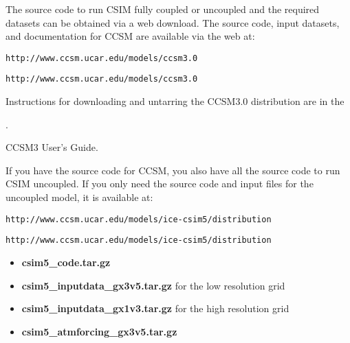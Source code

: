 The source code to run CSIM fully coupled or uncoupled and the required
datasets can be obtained via a web download.  The source code, input
datasets, and documentation for CCSM are available via the web at: \\

\begin{htmlonly}
                     {\tt http://www.ccsm.ucar.edu/models/ccsm3.0} \\
\end{htmlonly}
\begin{latexonly}
  {\tt http://www.ccsm.ucar.edu/models/ccsm3.0} \\
\end{latexonly}

Instructions for downloading and untarring the CCSM3.0 distribution
are in the 
\begin{htmlonly}
  .
\end{htmlonly}
\begin{latexonly}
  CCSM3 User's Guide.
\end{latexonly}
If you have the source code for CCSM, you also have all the source code to
run CSIM uncoupled.  If you only need the source code and input files for
the uncoupled model, it is available at: \\

\begin{htmlonly}
                   {\tt http://www.ccsm.ucar.edu/models/ice-csim5/distribution} \\
\end{htmlonly}
\begin{latexonly}
                   {\tt http://www.ccsm.ucar.edu/models/ice-csim5/distribution} \\
\end{latexonly}


\begin{itemize}
    \item {\bf csim5\_code.tar.gz}
    \item {\bf csim5\_inputdata\_gx3v5.tar.gz} for the low resolution grid
    \item {\bf csim5\_inputdata\_gx1v3.tar.gz} for the high resolution grid
    \item {\bf csim5\_atmforcing\_gx3v5.tar.gz} 
\end{itemize}

